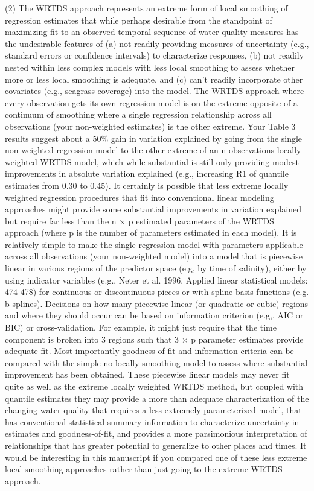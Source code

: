 \documentclass[letterpaper,12pt,oneside]{article}\usepackage[]{graphicx}\usepackage[]{color}
\begin{document}
(2) The WRTDS approach represents an extreme form of local smoothing of regression estimates that while perhaps desirable from the standpoint of maximizing fit to an observed temporal sequence of water quality measures has the undesirable features of (a) not readily providing measures of uncertainty (e.g., standard errors or confidence intervals) to characterize responses, (b) not readily nested within less complex models with less local smoothing to assess whether more or less local smoothing is adequate, and (c) can't readily incorporate other covariates (e.g., seagrass coverage) into the model.  The WRTDS approach where every observation gets its own regression model is on the extreme opposite of a continuum of smoothing where a single regression relationship across all observations (your non-weighted estimates) is the other extreme.  Your Table 3 results suggest about a 50\% gain in variation explained by going from the single non-weighted regression model to the other extreme of an n-observations locally weighted WRTDS model, which while substantial is still only providing modest improvements in absolute variation explained (e.g., increasing R1 of quantile estimates from 0.30 to 0.45).  It certainly is possible that less extreme locally weighted regression procedures that fit into conventional linear modeling approaches might provide some substantial improvements in variation explained but require far less than the n × p estimated parameters of the WRTDS approach (where p is the number of parameters estimated in each model).  It is relatively simple to make the single regression model with parameters applicable across all observations (your non-weighted model) into a model that is piecewise linear in various regions of the predictor space (e.g, by time of salinity), either by using indicator variables (e.g., Neter et al. 1996.  Applied linear statistical models: 474-478) for continuous or discontinuous pieces or with spline basis functions (e.g. b-splines).  Decisions on how many piecewise linear (or quadratic or cubic) regions and where they should occur can be based on information criterion (e.g,, AIC or BIC) or cross-validation.  For example, it might just require that the time component is broken into 3 regions such that 3 × p parameter estimates provide adequate fit.  Most importantly goodness-of-fit and information criteria can be compared with the simple no locally smoothing model to assess where substantial improvement has been obtained.  These piecewise linear models may never fit quite as well as the extreme locally weighted WRTDS method, but coupled with quantile estimates they may provide a more than adequate characterization of the changing water quality that requires a less extremely parameterized model, that has conventional statistical summary information to characterize uncertainty in estimates and goodness-of-fit, and provides a more parsimonious interpretation of relationships that has greater potential to generalize to other places and times.  It would be interesting in this manuscript if you compared one of these less extreme local smoothing approaches rather than just going to the extreme WRTDS approach.
\end{document}
